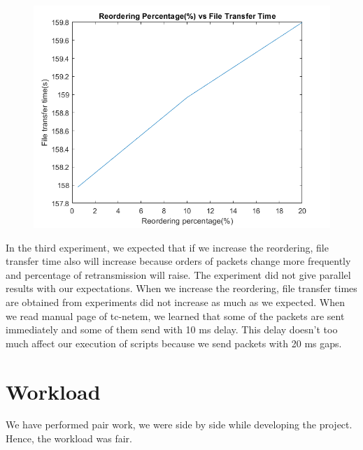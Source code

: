 \documentclass[conference]{IEEEtran}
\begin{document}
\begin{figure}[h]
\centerline{\includegraphics[scale=0.5]{exp3.png}}
\caption{}
\label{fig}
\end{figure}

In the third experiment, we expected that if we increase the reordering, file transfer time also will increase because orders of packets change more frequently and percentage of retransmission will raise. The experiment did not give parallel results with our expectations. When we increase the reordering,  file transfer times are obtained from experiments did not increase as much as we expected. When we read manual page of  tc-netem,  we learned that some of the packets are sent immediately and some of them send with 10 ms delay. This delay doesn't too much affect our execution of scripts because we send packets with 20 ms gaps. 

\section{Workload}

We have performed pair work, we were side by side while developing the project. Hence, the workload was fair.
\end{document}
